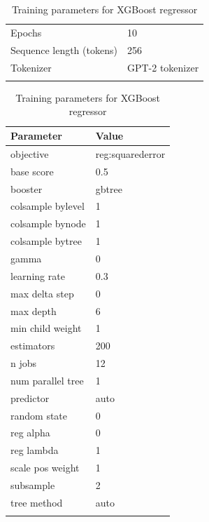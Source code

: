 \documentclass[sn-mathphys]{sn-jnl}%
\theoremstyle{thmstyleone}%
\theoremstyle{thmstyletwo}%
\theoremstyle{thmstylethree}%
\begin{document}
\begin{table}[!ht]
\begin{minipage}{.5\linewidth}
\begin{tabular}{@{}ll@{}}
                  Epochs                        & 10 \\
                  Sequence length (tokens)      & 256 \\
                  Tokenizer                     & GPT-2 tokenizer \\
                  \botrule
                  \end{tabular}
      \end{minipage}
      \begin{minipage}{.5\linewidth}
            \caption{Training parameters for XGBoost regressor}\label{table_xgboost_training_params}%
            \centering
                  \begin{tabular}{@{}ll@{}}
                  \toprule
                  Parameter               & Value \\
                  \midrule
                  objective               & reg:squarederror  \\
                  base score              & 0.5 \\
                  booster                 & gbtree  \\
                  colsample bylevel       & 1 \\
                  colsample bynode        & 1 \\
                  colsample bytree        & 1 \\
                  gamma\footnotemark[1]   & 0 \\
                  learning rate           & 0.3 \\
                  max delta step          & 0 \\
                  max depth               & 6 \\
                  min child weight        & 1 \\
                  estimators              & 200  \\
                  n jobs                  & 12  \\
                  num parallel tree       & 1 \\
                  predictor               & auto  \\
                  random state            & 0 \\
                  reg alpha               & 0 \\
                  reg lambda              & 1 \\
                  scale pos weight        & 1 \\
                  subsample               & 2 \\
                  tree method             & auto  \\
                  \botrule
                  \end{tabular}
      \end{minipage}
\end{table}
\end{document}
